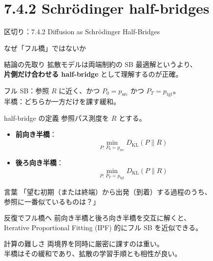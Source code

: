 \section{7.4.2 Schrödinger half-bridges}
\asmain
\begin{frame}{区切り：7.4.2 Diffusion as Schrödinger Half-Bridges}
    \tableofcontents[currentsection]
\end{frame}
\asmain
\begin{frame}{なぜ「フル橋」ではないか}
    \begin{block}{結論の先取り}
        拡散モデルは両端制約の SB 最適解というより、\\
        \textbf{片側だけ合わせる half-bridge} として理解するのが正確。
    \end{block}
    フル SB：参照 $R$ に近く、かつ $P_0=p_{\mathrm{src}}$ かつ $P_T=p_{\mathrm{tgt}}$。\\
    半橋：どちらか一方だけを課す緩和。
\end{frame}
\asmain
\begin{frame}{half-bridge の定義}
    参照パス測度を $R$ とする。
    \begin{itemize}
        \item \textbf{前向き半橋}：
        \[
            \min_{P:\,P_0=p_{\mathrm{src}}}
            D_{\mathrm{KL}}(P\|R)
        \]
        \item \textbf{後ろ向き半橋}：
        \[
            \min_{P:\,P_T=p_{\mathrm{tgt}}}
            D_{\mathrm{KL}}(P\|R)
        \]
    \end{itemize}
    \begin{exampleblock}{言葉}
        「望む初期（または終端）から出発（到着）する過程のうち、\\
        参照に一番似ているものは？」
    \end{exampleblock}
\end{frame}
\asmain
\begin{frame}{反復でフル橋へ}
    前向き半橋と後ろ向き半橋を交互に解くと、\\
    Iterative Proportional Fitting (IPF) 的にフル SB を近似できる。
    \begin{alertblock}{計算の難しさ}
        両境界を同時に厳密に課すのは重い。\\
        半橋はその緩和であり、拡散の学習手順とも相性が良い。
    \end{alertblock}
\end{frame}
